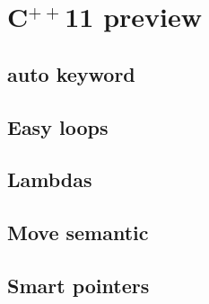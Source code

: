 \section[C$^{++}$11]{C$^{++}$11 preview}

\iffalse
\fi  %



\subsection[Auto]{auto keyword}
\subsection{Easy loops}
\subsection{Lambdas}
\subsection{Move semantic}
\subsection{Smart pointers}

